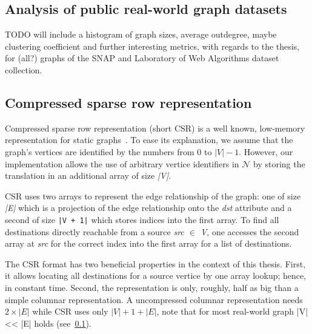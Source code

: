\subsection{Analysis of public real-world graph datasets}\label{subsec:graph-analysis}
TODO will include a histogram of graph sizes, average outdegree, maybe clustering coefficient and further interesting metrics, with
regards to the thesis, for (all?) graphs of the SNAP and Laboratory of Web Algorithms dataset collection.

\subsection{Compressed sparse row representation}\label{subsec:csr-background}
Compressed sparse row representation (short CSR) is a well known, low-memory representation for static graphs~\cite{csr,csr-first}.
To ease its explanation, we assume that the graph's vertices are identified by the numbers from 0 to $|V| - 1$.
However, our implementation allows the use of arbitrary vertice identifiers in $\mathcal{N}$ by storing the translation in an additional
array of size \textit{|V|}.

CSR uses two arrays to represent the edge relationship of the graph: one of size \textit{|E|} which is a projection of the edge relationship
onto the \textit{dst} attribute and a second of size \texttt{|V + 1|} which stores indices into the first array.
To find all destinations directly reachable from a source \textit{src $\in$ V}, one accesses the second array at \textit{src} for the
correct index into the first array for a list of destinations.

The CSR format has two beneficial properties in the context of this thesis.
First, it allows locating all destinations for a source vertice by one array lookup;
hence, in constant time.
Second, the representation is only, roughly, half as big than a simple columnar representation.
A uncompressed columnar representation needs $2 \times |E|$ while CSR uses only $|V| + 1 + |E|$, note that for most real-world graph |V|
<< |E| holds (see~\cref{subsec:graph-analysis}).




